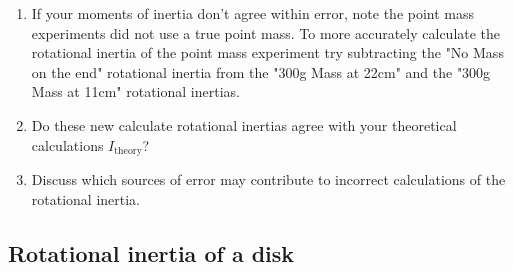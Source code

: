 \begin{enumerate}
\item If your moments of inertia don't agree within error, note the point mass experiments did not use a true point mass. To more accurately calculate the rotational inertia of the point mass experiment try subtracting the "No Mass on the end" rotational inertia from the "300g Mass at 22cm" and the "300g Mass at 11cm" rotational inertias. 
\item Do these new calculate rotational inertias agree with your theoretical calculations $I_\text{theory}$?
\item Discuss which sources of error may contribute to incorrect calculations of the rotational inertia.
\end{enumerate}

\subsection{Rotational inertia of a disk}

